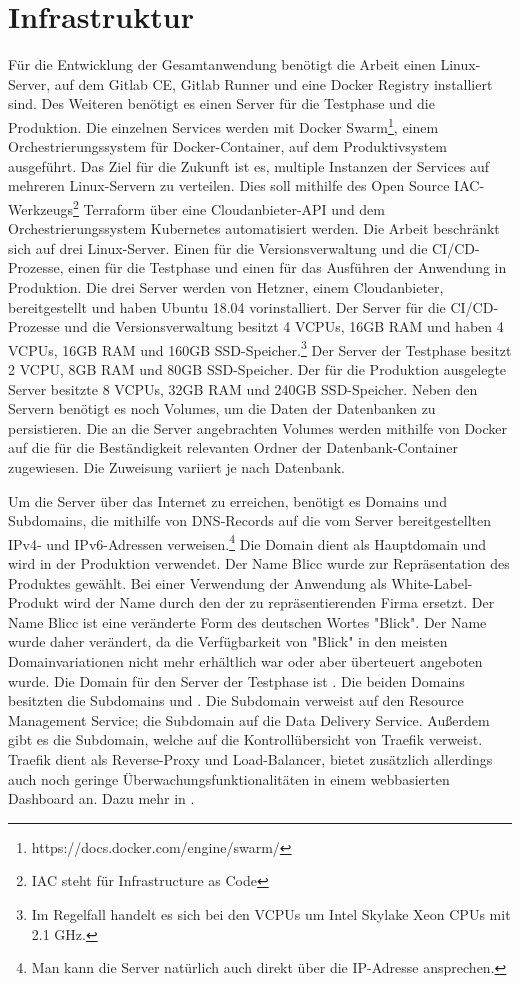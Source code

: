 \section{Infrastruktur}
\label{sec:infrastruktur}
Für die Entwicklung der Gesamtanwendung benötigt die Arbeit einen Linux-Server,
auf dem Gitlab CE, Gitlab Runner und eine Docker Registry
installiert sind. Des Weiteren benötigt es einen Server für die Testphase und die
Produktion. Die einzelnen Services werden mit Docker Swarm\footnote{https://docs.docker.com/engine/swarm/},
einem Orchestrierungssystem für Docker-Container, auf dem Produktivsystem ausgeführt. Das Ziel
für die Zukunft ist es, multiple Instanzen der Services auf mehreren Linux-Servern zu verteilen.
Dies soll mithilfe des Open Source IAC-Werkzeugs\footnote{IAC steht für Infrastructure as Code}
Terraform über eine Cloudanbieter-API und dem Orchestrierungssystem Kubernetes automatisiert werden.
Die Arbeit beschränkt sich auf drei Linux-Server. Einen für die Versionsverwaltung
und die CI/CD-Prozesse, einen für die Testphase und einen für das Ausführen der Anwendung in Produktion.
Die drei Server werden von Hetzner, einem Cloudanbieter, bereitgestellt und haben Ubuntu 18.04
vorinstalliert. Der Server für die CI/CD-Prozesse und die Versionsverwaltung besitzt 4 VCPUs, 
16GB RAM und  haben 4 VCPUs, 16GB RAM und 160GB SSD-Speicher.\footnote{Im Regelfall handelt es sich bei
den VCPUs um Intel Skylake Xeon CPUs mit 2.1 GHz.\cite{CPUusedInHetznerCLoud}}
Der Server der Testphase besitzt 2 VCPU, 8GB RAM und 80GB SSD-Speicher. Der für die Produktion
ausgelegte Server besitzte 8 VCPUs, 32GB RAM und 240GB SSD-Speicher.
Neben den Servern benötigt es noch Volumes, um die Daten der Datenbanken zu persistieren.
Die an die Server angebrachten Volumes werden mithilfe von Docker auf die für die
Beständigkeit relevanten Ordner der Datenbank-Container zugewiesen. Die Zuweisung variiert
je nach Datenbank.

Um die Server über das Internet zu erreichen, benötigt es Domains
und Subdomains, die mithilfe von DNS-Records auf die vom Server bereitgestellten
IPv4- und IPv6-Adressen verweisen.\footnote{Man kann die Server natürlich auch direkt über
die IP-Adresse ansprechen.} Die Domain  dient als
Hauptdomain und wird in der Produktion verwendet. Der Name Blicc
wurde zur Repräsentation des Produktes gewählt. Bei einer Verwendung der Anwendung
als White-Label-Produkt wird der Name durch den der zu repräsentierenden Firma ersetzt.
Der Name Blicc ist eine veränderte Form des deutschen Wortes "Blick". Der Name wurde
daher verändert, da die Verfügbarkeit von "Blick" in den meisten Domainvariationen
nicht mehr erhältlich war oder aber überteuert angeboten wurde. Die Domain für den
Server der Testphase ist . Die beiden Domains besitzten die
Subdomains  und . Die Subdomain  verweist auf
den Resource Management Service; die Subdomain  auf die Data Delivery Service.
Außerdem gibt es die  Subdomain, welche auf die Kontrollübersicht von Traefik
verweist. Traefik dient als Reverse-Proxy und Load-Balancer, bietet zusätzlich allerdings
auch noch geringe Überwachungsfunktionalitäten in einem webbasierten Dashboard an.
Dazu mehr in .

